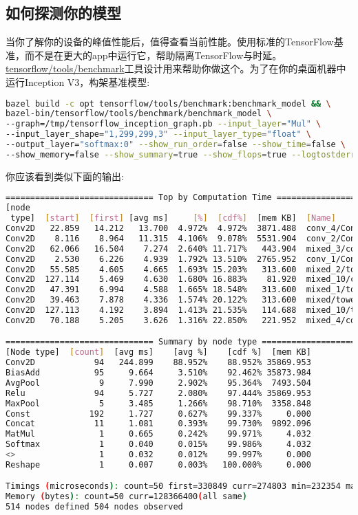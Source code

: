 \subsection{如何探测你的模型}
当你了解你的设备的峰值性能后，值得查看当前性能。使用标准的TensorFlow基准，而不是在更大的app中运行它，帮助隔离TensorFlow与时延。\href{https://www.github.com/tensorflow/tensorflow/blob/r1.4/tensorflow/tools/benchmark/}{tensorflow/tools/benchmark}工具设计用来帮助你做这个。为了在你的桌面机器中运行Inception V3，构架基准模型:
\begin{lstlisting}[language=Bash]
bazel build -c opt tensorflow/tools/benchmark:benchmark_model && \
bazel-bin/tensorflow/tools/benchmark/benchmark_model \
--graph=/tmp/tensorflow_inception_graph.pb --input_layer="Mul" \
--input_layer_shape="1,299,299,3" --input_layer_type="float" \
--output_layer="softmax:0" --show_run_order=false --show_time=false \
--show_memory=false --show_summary=true --show_flops=true --logtostderr 
\end{lstlisting}
你应该看到类似下面的输出:
\begin{lstlisting}[language=Bash]
============================== Top by Computation Time ==============================
[node
 type]  [start]  [first] [avg ms]     [%]  [cdf%]  [mem KB]  [Name]
Conv2D   22.859   14.212   13.700  4.972%  4.972%  3871.488  conv_4/Conv2D
Conv2D    8.116    8.964   11.315  4.106%  9.078%  5531.904  conv_2/Conv2D
Conv2D   62.066   16.504    7.274  2.640% 11.717%   443.904  mixed_3/conv/Conv2D
Conv2D    2.530    6.226    4.939  1.792% 13.510%  2765.952  conv_1/Conv2D
Conv2D   55.585    4.605    4.665  1.693% 15.203%   313.600  mixed_2/tower/conv_1/Conv2D
Conv2D  127.114    5.469    4.630  1.680% 16.883%    81.920  mixed_10/conv/Conv2D
Conv2D   47.391    6.994    4.588  1.665% 18.548%   313.600  mixed_1/tower/conv_1/Conv2D
Conv2D   39.463    7.878    4.336  1.574% 20.122%   313.600  mixed/tower/conv_1/Conv2D
Conv2D  127.113    4.192    3.894  1.413% 21.535%   114.688  mixed_10/tower_1/conv/Conv2D
Conv2D   70.188    5.205    3.626  1.316% 22.850%   221.952  mixed_4/conv/Conv2D

============================== Summary by node type ==============================
[Node type]  [count]  [avg ms]    [avg %]    [cdf %]  [mem KB]
Conv2D            94   244.899    88.952%    88.952% 35869.953
BiasAdd           95     9.664     3.510%    92.462% 35873.984
AvgPool            9     7.990     2.902%    95.364%  7493.504
Relu              94     5.727     2.080%    97.444% 35869.953
MaxPool            5     3.485     1.266%    98.710%  3358.848
Const            192     1.727     0.627%    99.337%     0.000
Concat            11     1.081     0.393%    99.730%  9892.096
MatMul             1     0.665     0.242%    99.971%     4.032
Softmax            1     0.040     0.015%    99.986%     4.032
<>                 1     0.032     0.012%    99.997%     0.000
Reshape            1     0.007     0.003%   100.000%     0.000

Timings (microseconds): count=50 first=330849 curr=274803 min=232354 max=415352 avg=275563 std=44193
Memory (bytes): count=50 curr=128366400(all same)
514 nodes defined 504 nodes observed
\end{lstlisting}
